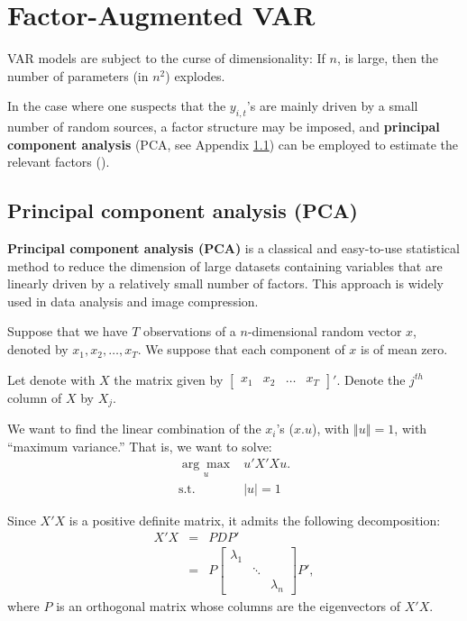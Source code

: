 \documentclass[
  12pt,
]{book}
\theoremstyle{definition}
\theoremstyle{definition}
\theoremstyle{definition}
\theoremstyle{definition}
\theoremstyle{remark}
\begin{document}
\hypertarget{FAVAR}{%
\chapter{Factor-Augmented VAR}\label{FAVAR}}

VAR models are subject to the curse of dimensionality: If \(n\), is large, then the number of parameters (in \(n^2\)) explodes.

In the case where one suspects that the \(y_{i,t}\)'s are mainly driven by a small number of random sources, a factor structure may be imposed, and \textbf{principal component analysis} (PCA, see Appendix \ref{PCAapp}) can be employed to estimate the relevant factors (\citet{Bernanke_Boivin_Eliasz_2005}).

\hypertarget{PCAapp}{%
\section{Principal component analysis (PCA)}\label{PCAapp}}

\textbf{Principal component analysis (PCA)} is a classical and easy-to-use statistical method to reduce the dimension of large datasets containing variables that are linearly driven by a relatively small number of factors. This approach is widely used in data analysis and image compression.

Suppose that we have \(T\) observations of a \(n\)-dimensional random vector \(x\), denoted by \(x_{1},x_{2},\ldots,x_{T}\). We suppose that each component of \(x\) is of mean zero.

Let denote with \(X\) the matrix given by \(\left[\begin{array}{cccc} x_{1} & x_{2} & \ldots & x_{T}\end{array}\right]'\). Denote the \(j^{th}\) column of \(X\) by \(X_{j}\).

We want to find the linear combination of the \(x_{i}\)'s (\(x.u\)), with \(\left\Vert u\right\Vert =1\), with ``maximum variance.'' That is, we want to solve:
\begin{equation}
\begin{array}{clll}
\underset{u}{\arg\max} & u'X'Xu. \\
\mbox{s.t. } & \left| u\right| =1
\end{array}\label{eq:PCA11}
\end{equation}

Since \(X'X\) is a positive definite matrix, it admits the following decomposition:
\begin{eqnarray*}
X'X & = & PDP'\\
& = & P\left[\begin{array}{ccc}
\lambda_{1}\\
& \ddots\\
&  & \lambda_{n}
\end{array}\right]P',
\end{eqnarray*}
where \(P\) is an orthogonal matrix whose columns are the eigenvectors of \(X'X\).
\end{document}
